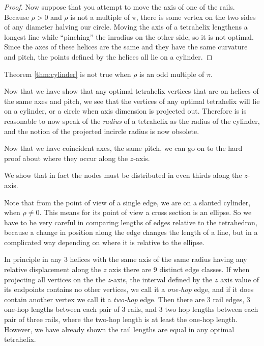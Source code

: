 \documentclass[11pt]{article}
\begin{document}
\begin{proof}
Now suppose that you attempt to move the axis of one of the rails. Because
$\rho > 0 $ and $\rho$ is not a multiple of $\pi$, there is some vertex on the two sides of any diameter
halving our circle. Moving the axis of a tetrahelix lengthens a longest line while ``pinching'' the
inradius on the other side, so it is not optimal. Since the axes of these helices are the
same and they have the same curvature and pitch, the points defined by the helices all lie
on a cylinder.


\end{proof}

Theorem \ref{thm:cylinder} is not true when $\rho$ is an odd multiple of $\pi$.

Now that we have show that any optimal tetrahelix vertices that
are on helices of the same axes and pitch, we see that the vertices 
of any optimal tetrahelix will lie on a cylinder, or a circle when axis dimension
is projected out. Therefore is is reasonable to now speak of the \emph{radius}
of a tetrahelix as the radius of the cylinder, and the notion
of the projected incircle radius is now obsolete.

Now that we have coincident axes, the same pitch, we can go on to
 the hard proof about where they occur along the $z$-axis.

 We show that in fact the nodes must be distributed in even thirds
 along the $z$-axis.

 Note that from the point of view of a single edge, we are on a
 slanted cylinder, when $\rho \neq 0$.  This means for its point of
 view a cross section is an ellipse. So we have to be very careful in
 comparing lengths of edges relative to the tetrahedron, because a
 change in position along the edge changes the length of a line, but
 in a complicated way depending on where it is relative to the
 ellipse.

 In principle in any 3 helices with the same axis of the same radius
 having any relative
 displacement along the $z$ axis there are 9 distinct edge classes.
 If when projecting all vertices on the the $z$-axis, the interval
 defined by the $z$ axis value of its endpoints contains no other vertices,
 we call it a \emph{one-hop} edge, and if it does contain another vertex we
 call it a \emph{two-hop} edge.
 Then there are 
 3 rail edges, 3 one-hop lengths between each pair of 3 rails, and 3 two hop
 lengths between each pair of three rails, where the two-hop length is at least
 the one-hop length.
 However, we have already shown the rail
 lengths are equal in any optimal tetrahelix.
\end{document}
